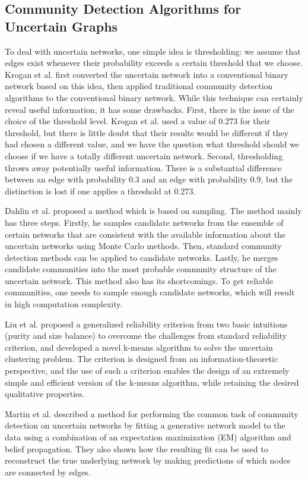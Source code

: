 \documentclass[\main/thesis.tex]{subfiles}
\begin{document}
\subsection{Community Detection Algorithms for Uncertain Graphs}
To deal with uncertain networks, one simple idea is thresholding: we assume that edges exist whenever their probability exceeds a certain threshold that we choose. Krogan et al. \cite{krogan2006global} first converted the uncertain network into a conventional binary network based on this idea, then applied traditional community detection algorithms to the conventional binary network. While this technique can certainly reveal useful information, it has some drawbacks. First, there is the issue of the choice of the threshold level. Krogan et al. used a value of 0.273 for their threshold, but there is little doubt that their results would be different if they had chosen a different value, and we have the question what threshold should we choose if we have a totally different uncertain network. Second, thresholding throws away potentially useful information. There is a substantial difference between an edge with probability 0.3 and an edge with probability 0.9, but the distinction is lost if one applies a threshold at 0.273.

Dahlin et al. \cite{dahlin2011method} proposed a method which is based on sampling. The method mainly has three steps. Firstly, he samples candidate networks from the ensemble of certain networks that are consistent with the available information about the uncertain networks using Monte Carlo methods. Then, standard community detection methods can be applied to candidate networks. Lastly, he merges candidate communities into the most probable community structure of the uncertain network. This method also has its shortcomings. To get reliable communities, one needs to sample enough candidate networks, which will result in high computation complexity.

Liu et al. \cite{liureliable} proposed a generalized reliability criterion from two basic intuitions (purity and size balance) to overcome the challenges from standard reliability criterion, and developed a novel k-means algorithm to solve the uncertain clustering problem. The criterion is designed from an information-theoretic perspective, and the use of such a criterion enables the design of an extremely simple and efficient version of the k-means algorithm, while retaining the desired qualitative properties.

Martin et al. \cite{martin2016structural} described a method for performing the common task of community detection on uncertain networks by fitting a generative network model to the data using a combination of an expectation maximization (EM) algorithm and belief propagation. They also shown how the resulting fit can be used to reconstruct the true underlying network by making predictions of which nodes are connected by edges. 
\end{document}

